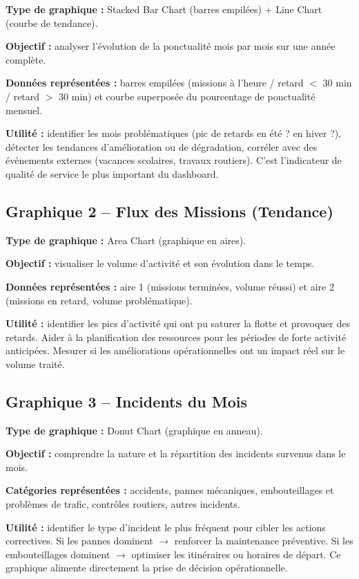\documentclass[12pt,a4paper]{report}
\begin{document}
\textbf{Type de graphique :} Stacked Bar Chart (barres empilées) + Line
Chart (courbe de tendance).

\textbf{Objectif :} analyser l'évolution de la ponctualité mois par mois
sur une année complète.

\textbf{Données représentées :} barres empilées (missions à l'heure /
retard $<$ 30 min / retard $>$ 30 min) et courbe superposée du pourcentage
de ponctualité mensuel.

\textbf{Utilité :} identifier les mois problématiques (pic de retards en
été ? en hiver ?), détecter les tendances d'amélioration ou de
dégradation, corréler avec des événements externes (vacances scolaires,
travaux routiers). C'est l'indicateur de qualité de service le plus
important du dashboard.

\subsection{Graphique 2 -- Flux des Missions (Tendance)}

\textbf{Type de graphique :} Area Chart (graphique en aires).

\textbf{Objectif :} visualiser le volume d'activité et son évolution dans
le temps.

\textbf{Données représentées :} aire 1 (missions terminées, volume réussi)
et aire 2 (missions en retard, volume problématique).

\textbf{Utilité :} identifier les pics d'activité qui ont pu saturer la
flotte et provoquer des retards. Aider à la planification des ressources
pour les périodes de forte activité anticipées. Mesurer si les
améliorations opérationnelles ont un impact réel sur le volume traité.

\subsection{Graphique 3 -- Incidents du Mois}

\textbf{Type de graphique :} Donut Chart (graphique en anneau).

\textbf{Objectif :} comprendre la nature et la répartition des incidents
survenus dans le mois.

\textbf{Catégories représentées :} accidents, pannes mécaniques,
embouteillages et problèmes de trafic, contrôles routiers, autres incidents.

\textbf{Utilité :} identifier le type d'incident le plus fréquent pour
cibler les actions correctives. Si les pannes dominent $\rightarrow$
renforcer la maintenance préventive. Si les embouteillages dominent
$\rightarrow$ optimiser les itinéraires ou horaires de départ. Ce
graphique alimente directement la prise de décision opérationnelle.
\end{document}
